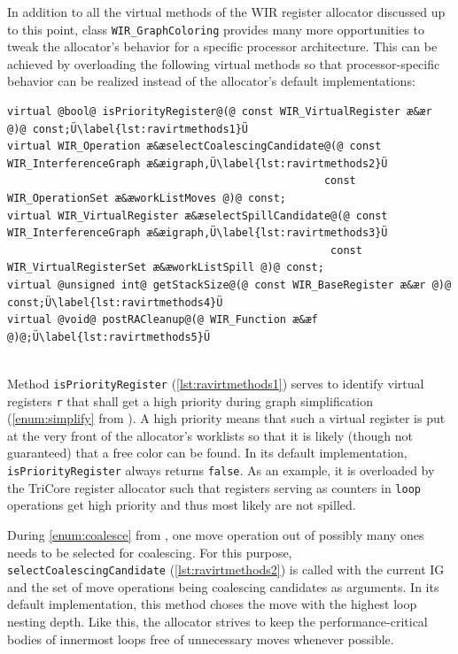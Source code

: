 In addition to all the virtual methods of the \gls{WIR} register allocator discussed up to this point, class \texttt{WIR\_Graph\-Coloring} provides many more opportunities to tweak the allocator's behavior for a specific processor architecture.
This can be achieved by overloading the following virtual methods so that processor-specific behavior can be realized instead of the allocator's default implementations: \\
\begin{lstlisting}[style=code,float=!ht,aboveskip=-0.8 \baselineskip,belowskip=-0.8 \baselineskip]
virtual @bool@ isPriorityRegister@(@ const WIR_VirtualRegister æ&ær @)@ const;Ü\label{lst:ravirtmethods1}Ü
virtual WIR_Operation æ&æselectCoalescingCandidate@(@ const WIR_InterferenceGraph æ&æigraph,Ü\label{lst:ravirtmethods2}Ü
                                                  const WIR_OperationSet æ&æworkListMoves @)@ const;
virtual WIR_VirtualRegister æ&æselectSpillCandidate@(@ const WIR_InterferenceGraph æ&æigraph,Ü\label{lst:ravirtmethods3}Ü
                                                   const WIR_VirtualRegisterSet æ&æworkListSpill @)@ const;
virtual @unsigned int@ getStackSize@(@ const WIR_BaseRegister æ&ær @)@ const;Ü\label{lst:ravirtmethods4}Ü
virtual @void@ postRACleanup@(@ WIR_Function æ&æf @)@;Ü\label{lst:ravirtmethods5}Ü
\end{lstlisting}
\\
Method \texttt{isPriorityRegister} (\cref{lst:ravirtmethods1}) serves to identify virtual registers \texttt{r} that shall get a high priority during graph simplification (\cref{enum:simplify} from ).
A high priority means that such a virtual register is put at the very front of the allocator's worklists so that it is likely (though not guaranteed) that a free color can be found.
In its default implementation, \texttt{isPriorityRegister} always returns \texttt{false}.
As an example, it is overloaded by the TriCore register allocator such that registers serving as counters in \texttt{loop} operations get high priority and thus most likely are not spilled.

During \cref{enum:coalesce} from , one move operation out of possibly many ones needs to be selected for coalescing.
For this purpose, \texttt{selectCoalescingCandidate} (\cref{lst:ravirtmethods2}) is called with the current \gls{IG} and the set of move operations being coalescing candidates as arguments.
In its default implementation, this method choses the move with the highest loop nesting depth.
Like this, the allocator strives to keep the performance-critical bodies of innermost loops free of unnecessary moves whenever possible.

